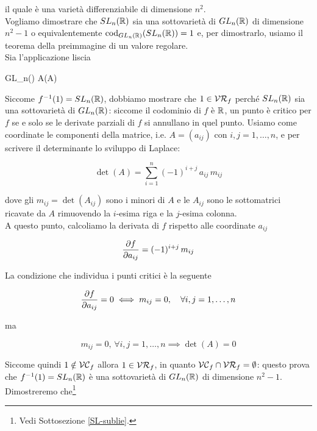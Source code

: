 il quale è una varietà differenziabile di dimensione $ n^{2} $.\\
Vogliamo dimostrare che $ SL_{n}(\mathbb{R}) $ sia una sottovarietà di $ GL_{n}(\mathbb{R}) $ di dimensione $ n^{2}-1 $ o equivalentemente $ \operatorname{cod}_{GL_{n}(\mathbb{R})}(SL_{n}(\mathbb{R})) = 1 $ e, per dimostrarlo, usiamo il teorema della preimmagine di un valore regolare.\\
Sia l'applicazione liscia

	{GL_{n}(\R)}{\R}
	{A}{\det(A)}

Siccome $ f^{-1}(1) = SL_{n}(\mathbb{R}) $, dobbiamo mostrare che $ 1 \in \mathcal{VR}_{f} $ perché $ SL_{n}(\mathbb{R}) $ sia una sottovarietà di $ GL_{n}(\mathbb{R}) $: siccome il codominio di $ f $ è $ \mathbb{R} $, un punto è critico per $ f $ se e solo se le derivate parziali di $ f $ si annullano in quel punto. Usiamo come coordinate le componenti della matrice, i.e. $ A = (a_{ij}) $ con $ i,j=1,\dots,n $, e per scrivere il determinante lo sviluppo di Laplace:

\begin{equation}
	\det(A) = \sum_{i=1}^{n} (-1)^{i+j} \, a_{ij} \, m_{ij}
\end{equation}

dove gli $ m_{ij} = \det(A_{ij}) $ sono i minori di $ A $ e le $ A_{ij} $ sono le sottomatrici ricavate da $ A $ rimuovendo la $ i $-esima riga e la $ j $-esima colonna.\\
A questo punto, calcoliamo la derivata di $ f $ rispetto alle coordinate $ a_{ij} $

\begin{equation}
	\pdv{f}{a_{ij}} = (-1)^{i+j} \, m_{ij}
\end{equation}

La condizione che individua i punti critici è la seguente

\begin{align}
	\pdv{f}{a_{ij}} = 0 \iff m_{ij} = 0 \qcomma \forall i,j=1,\dots,n
\end{align}

ma

\begin{equation}
	m_{ij} = 0, \, \forall i,j=1,\dots,n \implies \det(A) = 0
\end{equation}

Siccome quindi $ 1 \notin \mathcal{VC}_{f} $ allora $ 1 \in \mathcal{VR}_{f} $, in quanto $ \mathcal{VC}_{f} \cap \mathcal{VR}_{f} = \emptyset $: questo prova che $ f^{-1}(1) = SL_{n}(\mathbb{R}) $ è una sottovarietà di $ GL_{n}(\mathbb{R}) $ di dimensione $ n^{2}-1 $.\\
Dimostreremo che\footnote{%
	Vedi Sottosezione \ref{SL-sublie}.}

